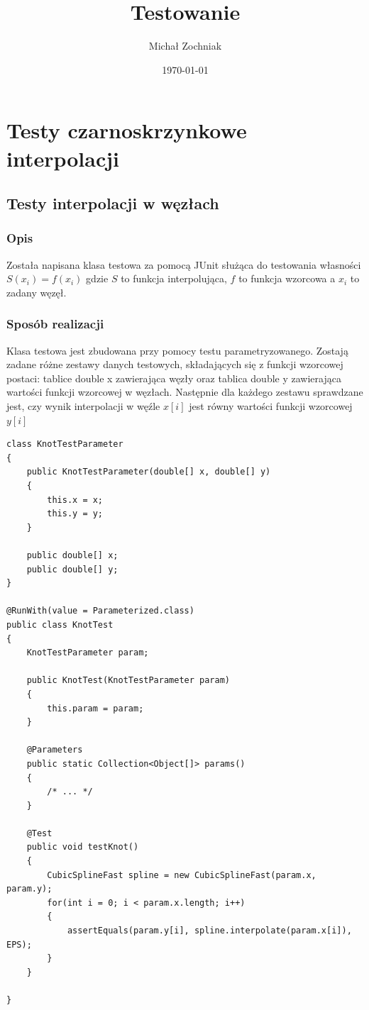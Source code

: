 \documentclass[a4paper,11pt,notitlepage]{article}
\author{ Michał Zochniak }
\title{ Testowanie }
\date{\today}
\begin{document}
\maketitle

\section{Testy czarnoskrzynkowe interpolacji}

\subsection{Testy interpolacji w węzłach}

\subsubsection{Opis}

Została napisana klasa testowa za pomocą JUnit służąca do testowania własności $S(x_i) = f(x_i)$ gdzie $S$ to funkcja interpolująca, $f$ to funkcja wzorcowa a $x_i$ to zadany węzęł.

\subsubsection{Sposób realizacji}

Klasa testowa jest zbudowana przy pomocy testu parametryzowanego. Zostają zadane różne zestawy danych testowych, składających się z funkcji wzorcowej postaci: tablice double x zawierająca węzły oraz tablica double y zawierająca wartości funkcji wzorcowej w węzłach. Następnie dla każdego zestawu sprawdzane jest, czy wynik interpolacji w węźle $x[i]$ jest równy wartości funkcji wzorcowej $y[i]$

\begin{lstlisting}
class KnotTestParameter
{
    public KnotTestParameter(double[] x, double[] y)
    {
        this.x = x;
        this.y = y;
    }

    public double[] x;
    public double[] y;
}

@RunWith(value = Parameterized.class)
public class KnotTest
{
    KnotTestParameter param;

    public KnotTest(KnotTestParameter param)
    {
        this.param = param;
    }

    @Parameters
    public static Collection<Object[]> params()
    {
       	/* ... */
    }

    @Test
    public void testKnot()
    {
        CubicSplineFast spline = new CubicSplineFast(param.x, param.y);
        for(int i = 0; i < param.x.length; i++)
        {
            assertEquals(param.y[i], spline.interpolate(param.x[i]), EPS);
        }
    }

}
\end{lstlisting}
\end{document}
